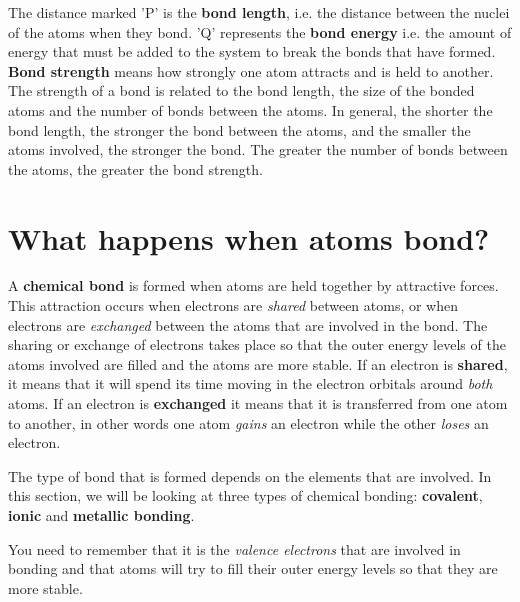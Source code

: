 The distance marked 'P' is the \textbf{bond length}, i.e. the distance between the nuclei of the atoms when they bond. 'Q' represents the \textbf{bond energy} i.e. the amount of energy that must be added to the system to break the bonds that have formed. \textbf{Bond strength} means how strongly one atom attracts and is held to another. The strength of a bond is related to the bond length, the size of the bonded atoms and the number of bonds between the atoms. In general, the shorter the bond length, the stronger the bond between the atoms, and the smaller the atoms involved, the stronger the bond. The greater the number of bonds between the atoms, the greater the bond strength.






\section{What happens when atoms bond?}
\label{sec:bonding:what happens}

A \textbf{chemical bond} is formed when atoms are held together by attractive forces. This attraction occurs when electrons are \textit{shared} between atoms, or when electrons are \textit{exchanged} between the atoms that are involved in the bond. The sharing or exchange of electrons takes place so that the outer energy levels of the atoms involved are filled and the atoms are more stable. If an electron is \textbf{shared}, it means that it will spend its time moving in the electron orbitals around \textit{both} atoms. If an electron is \textbf{exchanged} it means that it is transferred from one atom to another, in other words one atom \textit{gains} an electron while the other \textit{loses} an electron.


The type of bond that is formed depends on the elements that are involved. In this section, we will be looking at three types of chemical bonding: \textbf{covalent}, \textbf{ionic} and \textbf{metallic bonding}.

You need to remember that it is the \textit{valence electrons} that are involved in bonding and that atoms will try to fill their outer energy levels so that they are more stable.


